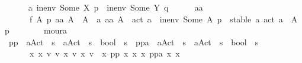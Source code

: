 \begin{isabellebody}
\ \ \ \ \isamarkupfalse%
\ a{}{\isacharcolon}{\kern0pt}\ {\isachardoublequoteopen}in{\isacharunderscore}{\kern0pt}env\ {\isacharparenleft}{\kern0pt}Some\ X{\isacharparenright}{\kern0pt}\ p\ {\isacharequal}{\kern0pt}\ in{\isacharunderscore}{\kern0pt}env\ {\isacharparenleft}{\kern0pt}Some\ Y{\isacharparenright}{\kern0pt}\ q{\isachardoublequoteclose}\isanewline
\ \ \ \ \isamarkupfalse%
\ aa\ \isanewline
\ \ \ \ \ \ f{}{\isacharcolon}{\kern0pt}\ {\isachardoublequoteopen}{\isasymforall}A\ p{\isachardot}{\kern0pt}\ aa\ A\ {\isasymin}\ A\ {\isasymand}\ {\isacharparenleft}{\kern0pt}{\isasymforall}a{\isachardot}{\kern0pt}\ aa\ A\ {\isasymnoteq}\ act\ a{\isacharparenright}{\kern0pt}\ {\isasymor}\ in{\isacharunderscore}{\kern0pt}env\ {\isacharparenleft}{\kern0pt}Some\ A{\isacharparenright}{\kern0pt}\ p\ {\isacharequal}{\kern0pt}\ stable\ {\isacharbraceleft}{\kern0pt}a{\isachardot}{\kern0pt}\ act\ a\ {\isasymin}\ A{\isacharbraceright}{\kern0pt}\ p{\isachardoublequoteclose}\isanewline
\ \ \ \ \ \ \isamarkupfalse%
\ moura\isanewline
\ \ \ \ \isamarkupfalse%
\ pp\ {\isacharcolon}{\kern0pt}{\isacharcolon}{\kern0pt}\ {\isachardoublequoteopen}{\isacharparenleft}{\kern0pt}{\isacharprime}{\kern0pt}a{\isacharparenright}{\kern0pt}Act{\isacharunderscore}{\kern0pt}{\isasymtheta}\ {\isasymRightarrow}\ {\isacharparenleft}{\kern0pt}{\isacharprime}{\kern0pt}s\ {\isasymRightarrow}\ {\isacharparenleft}{\kern0pt}{\isacharprime}{\kern0pt}a{\isacharparenright}{\kern0pt}Act{\isacharunderscore}{\kern0pt}{\isasymtheta}\ {\isasymRightarrow}\ {\isacharprime}{\kern0pt}s\ {\isasymRightarrow}\ bool{\isacharparenright}{\kern0pt}\ {\isasymRightarrow}\ {\isacharprime}{\kern0pt}s{\isachardoublequoteclose}\ \ ppa\ {\isacharcolon}{\kern0pt}{\isacharcolon}{\kern0pt}\ {\isachardoublequoteopen}{\isacharparenleft}{\kern0pt}{\isacharprime}{\kern0pt}a{\isacharparenright}{\kern0pt}Act{\isacharunderscore}{\kern0pt}{\isasymtheta}\ {\isasymRightarrow}\ {\isacharparenleft}{\kern0pt}{\isacharprime}{\kern0pt}s\ {\isasymRightarrow}\ {\isacharparenleft}{\kern0pt}{\isacharprime}{\kern0pt}a{\isacharparenright}{\kern0pt}Act{\isacharunderscore}{\kern0pt}{\isasymtheta}\ {\isasymRightarrow}\ {\isacharprime}{\kern0pt}s\ {\isasymRightarrow}\ bool{\isacharparenright}{\kern0pt}\ {\isasymRightarrow}\ {\isacharprime}{\kern0pt}s{\isachardoublequoteclose}\ \isanewline
\ \ \ \ \ \ {\isachardoublequoteopen}{\isasymforall}x{}\ x{}{\isachardot}{\kern0pt}\ {\isacharparenleft}{\kern0pt}{\isasymexists}v{}\ v{}{\isachardot}{\kern0pt}\ x{}\ v{}\ x{}\ v{}{\isacharparenright}{\kern0pt}\ {\isacharequal}{\kern0pt}\ x{}\ {\isacharparenleft}{\kern0pt}pp\ x{}\ x{}{\isacharparenright}{\kern0pt}\ x{}\ {\isacharparenleft}{\kern0pt}ppa\ x{}\ x{}{\isacharparenright}{\kern0pt}{\isachardoublequoteclose}\isanewline

\end{isabellebody}
